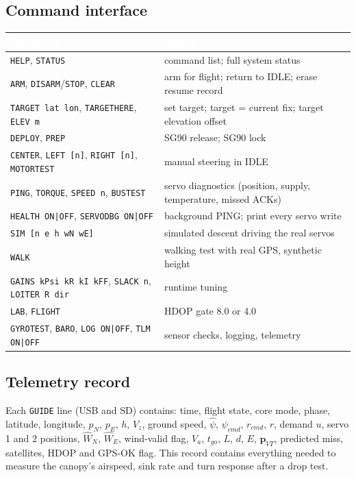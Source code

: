 \documentclass[11pt,a4paper]{article}
\newcommand{\hdr}[1]{\textcolor{white}{\textbf{#1}}}
\newcommand{\code}[1]{\texttt{#1}}
\newcommand{\vect}[1]{\mathbf{#1}}
\begin{document}
\subsection{Command interface}
\begin{center}
\small
\renewcommand{\arraystretch}{1.12}
\begin{tabularx}{\linewidth}{p{4.3cm}Y}
\toprule
{}\hdr{Command} & \hdr{Action} \\
\midrule
\code{HELP}, \code{STATUS} & command list; full system status \\
\code{ARM}, \code{DISARM}/\code{STOP}, \code{CLEAR} & arm for flight; return to IDLE; erase resume record \\
\code{TARGET lat lon}, \code{TARGETHERE}, \code{ELEV m} & set target; target = current fix; target elevation offset \\
\code{DEPLOY}, \code{PREP} & SG90 release; SG90 lock \\
\code{CENTER}, \code{LEFT [n]}, \code{RIGHT [n]}, \code{MOTORTEST} & manual steering in IDLE \\
\code{PING}, \code{TORQUE}, \code{SPEED n}, \code{BUSTEST} & servo diagnostics (position, supply, temperature, missed ACKs) \\
\code{HEALTH ON|OFF}, \code{SERVODBG ON|OFF} & background PING; print every servo write \\
\code{SIM [n e h wN wE]} & simulated descent driving the real servos \\
\code{WALK} & walking test with real GPS, synthetic height \\
\code{GAINS kPsi kR kI kFF}, \code{SLACK n}, \code{LOITER R dir} & runtime tuning \\
\code{LAB}, \code{FLIGHT} & HDOP gate 8.0 or 4.0 \\
\code{GYROTEST}, \code{BARO}, \code{LOG ON|OFF}, \code{TLM ON|OFF} & sensor checks, logging, telemetry \\
\bottomrule
\end{tabularx}
\end{center}

\subsection{Telemetry record}
Each \code{GUIDE} line (USB and SD) contains: time, flight state, core mode,
phase, latitude, longitude, $p_N$, $p_E$, $h$, $V_z$, ground speed,
$\hat\psi$, $\psi_{cmd}$, $r_{cmd}$, $r$, demand $u$, servo 1 and 2 positions,
$\hat W_N$, $\hat W_E$, wind-valid flag, $V_a$, $t_{go}$, $L$, $d$, $E$,
$\vect p_{VT}$, predicted miss, satellites, HDOP and GPS-OK flag. This record
contains everything needed to measure the canopy's airspeed, sink rate and
turn response after a drop test.
\end{document}
